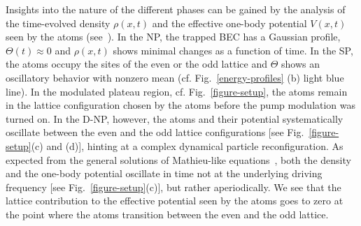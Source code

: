 \documentclass[aps,prl,twocolumn,superscriptaddress,groupedaddress]{revtex4}  %
\begin{document}
{{%

Insights into the nature of the different phases can be gained by the analysis of the time-evolved density $\rho(x, t)$ and the effective one-body potential $V (x, t)$ seen by the atoms (see~\cite{supmat}). 
In the NP, the trapped BEC has a Gaussian profile, $\Theta(t) \approx 0$ and $\rho(x, t)$ shows minimal changes as a function of time.
In the SP, the atoms occupy the sites of the even or the odd lattice and $\Theta$ shows an oscillatory behavior with nonzero mean (cf. Fig.~\ref{energy-profiles} (b) light blue line). 
In the modulated plateau region, cf. Fig.~\ref{figure-setup}, the atoms 
remain in the lattice configuration chosen by the atoms before the pump modulation was turned on.
In the D-NP, however, the atoms and their potential systematically oscillate between the even and the odd lattice configurations [see Fig.~\ref{figure-setup}(c) and (d)], hinting at a complex dynamical 
particle reconfiguration. As expected from the general solutions of Mathieu-like equations~\cite{HillsEq, mclachlan}, both the density and the one-body potential oscillate in time not at the 
underlying driving frequency [see Fig.~\ref{figure-setup}(c)], but rather aperiodically.
We see that the lattice contribution to the effective potential seen by the atoms goes to zero at the point where the atoms transition between the even and the odd lattice.




}}
\end{document}
